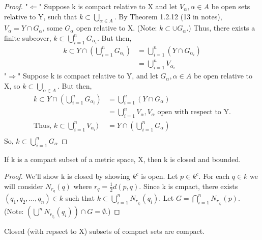 \documentclass[11pt,fleqn]{book} %
\begin{document}
\begin{proof}
	"\underline{$\Leftarrow$}" Suppose k is compact relative to X and let $V_\alpha, \alpha \in A$ be open sets relative to Y, such that $k \subset \bigcup\limits_{\alpha \in A}$. By Theorem 1.2.12 (13 in notes), $V_\alpha = Y\cap G_\alpha$, some $G_\alpha$ open relative to X. (Note: $k \subset \cup G_\alpha$.) Thus, there exists a finite subcover, $k \subset \bigcup\limits^n_{i=1} G_{\alpha_i}$. But then, 
		\begin{align*}
			k \subset Y \cap (\bigcup\limits^n_{i=1} G_{\alpha_i}) &= \bigcup\limits^n_{i=1}(Y \cap G_{\alpha_i})\\
			&= \bigcup\limits^n_{i=1} V_{\alpha_i}
		\end{align*}
	"\underline{$\Rightarrow$}" Suppose k is compact relative to Y, and let $G_\alpha, \alpha \in A$ be open relative to X, so $k \subset \bigcup\limits_{\alpha \in A}$. But then,
		\begin{align*}
		 	k \subset Y \cap (\bigcup\limits^n_{i=1} G_{\alpha_i}) &= \bigcup\limits^n_{i=1}(Y \cap G_{\alpha})\\
			&= \bigcup\limits^n_{i=1} V_{\alpha}, V_\alpha \text{ open with respect to Y.}\\
			\text{Thus, } k \subset \bigcup\limits^n_{i=1} V_{\alpha_i}) &= Y \cap (\bigcup\limits^n_{i=1} G_{\alpha})\\
		 \end{align*}
		 So, $k \subset \bigcup\limits^n_{i=1} G_{\alpha}$ 
\end{proof}

\begin{theorem}
	If k is a compact subset of a metric space, X, then k is closed and bounded.
\end{theorem}

\begin{proof}
	We'll show k is closed by showing $k^c$ is open. Let $p \in k^c$. For each $q \in k$ we will consider $N_{r_q}(q)$ where $r_q = \frac{1}{2} d(p,q)$. Since k is cmpact, there exists $(q_1, q_2, \dots, q_n) \in k$ such that $k \subset \bigcup\limits^n_{i=1} N_{r_{q_i}}(q_i)$. Let $G = \bigcap\limits^n_{i=1} N_{r_{q_i}}(p)$. (Note: $(\bigcup\limits^n N_{r_{q_i}}(q_i))\cap G = \emptyset$.)
\end{proof}

\begin{theorem}
	Closed (with repsect to X) subsets of compact sets are compact.
\end{theorem}
\end{document}
